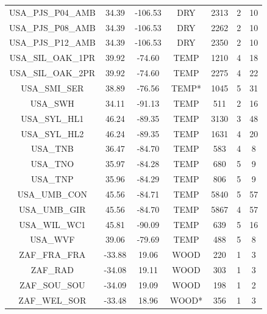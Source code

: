 \documentclass[11pt,twoside]{reedthesis}
\begin{document}
\begin{longtable}[t]{ccccccc}
USA\_PJS\_P04\_AMB & 34.39 & -106.53 & DRY & 2313 & 2 & 10\\
USA\_PJS\_P08\_AMB & 34.39 & -106.53 & DRY & 2262 & 2 & 10\\
USA\_PJS\_P12\_AMB & 34.39 & -106.53 & DRY & 2350 & 2 & 10\\
USA\_SIL\_OAK\_1PR & 39.92 & -74.60 & TEMP & 1210 & 4 & 18\\
USA\_SIL\_OAK\_2PR & 39.92 & -74.60 & TEMP & 2275 & 4 & 22\\
USA\_SMI\_SER & 38.89 & -76.56 & TEMP* & 1045 & 5 & 31\\
USA\_SWH & 34.11 & -91.13 & TEMP & 511 & 2 & 16\\
USA\_SYL\_HL1 & 46.24 & -89.35 & TEMP & 3130 & 3 & 48\\
USA\_SYL\_HL2 & 46.24 & -89.35 & TEMP & 1631 & 4 & 20\\
USA\_TNB & 36.47 & -84.70 & TEMP & 583 & 4 & 8\\
USA\_TNO & 35.97 & -84.28 & TEMP & 680 & 5 & 9\\
USA\_TNP & 35.96 & -84.29 & TEMP & 806 & 5 & 9\\
USA\_UMB\_CON & 45.56 & -84.71 & TEMP & 5840 & 5 & 57\\
USA\_UMB\_GIR & 45.56 & -84.70 & TEMP & 5867 & 4 & 57\\
USA\_WIL\_WC1 & 45.81 & -90.09 & TEMP & 639 & 5 & 16\\
USA\_WVF & 39.06 & -79.69 & TEMP & 488 & 5 & 8\\
ZAF\_FRA\_FRA & -33.88 & 19.06 & WOOD & 220 & 1 & 3\\
ZAF\_RAD & -34.08 & 19.11 & WOOD & 303 & 1 & 3\\
ZAF\_SOU\_SOU & -34.09 & 19.09 & WOOD & 198 & 1 & 2\\
ZAF\_WEL\_SOR & -33.48 & 18.96 & WOOD* & 356 & 1 & 3\\*
\end{longtable}
\endgroup{} \newpage
\end{document}

